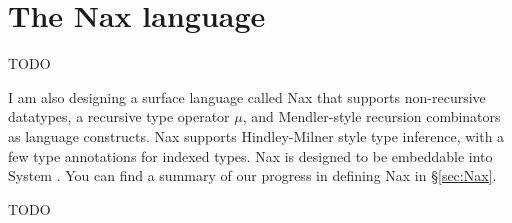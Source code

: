 \chapter{The Nax language}\label{ch:nax} TODO

I am also designing a surface language called Nax that supports
non-recursive datatypes, a recursive type operator $\mu$, and
Mendler-style recursion combinators as language constructs.
Nax supports Hindley-Milner style type inference, with a few type annotations
for indexed types. Nax is designed to be embeddable into System \Fi.
You can find a summary of our progress in defining Nax in \S\ref{sec:Nax}.


TODO
